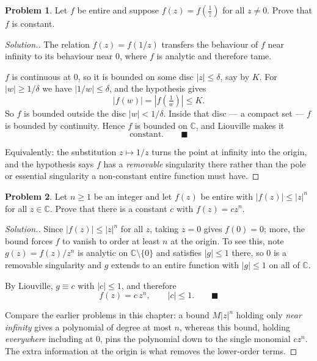 \documentclass[11pt,a4paper]{article}
\theoremstyle{definition}
\newtheorem{problemx}{Problem}[section]
\newenvironment{problem}{\begin{problemx}}{\end{problemx}}
\newenvironment{solution}
  {\renewcommand{\qedsymbol}{}\begin{proof}[\textit{Solution}.]}
  {\end{proof}}
\begin{document}
\begin{problem}
Let $f$ be entire and suppose $f(z) = f\!\left(\frac{1}{z}\right)$ for all
$z \neq 0$. Prove that $f$ is constant.
\end{problem}

\begin{solution}
The relation $f(z) = f(1/z)$ transfers the behaviour of $f$ near infinity to its
behaviour near $0$, where $f$ is analytic and therefore tame.

$f$ is continuous at $0$, so it is bounded on some disc $\left|z\right| \leq \delta$,
say by $K$. For $\left|w\right| \geq 1/\delta$ we have
$\left|1/w\right| \leq \delta$, and the hypothesis gives
$$\left|f(w)\right| = \left|f\!\left(\tfrac1w\right)\right| \leq K .$$
So $f$ is bounded outside the disc $\left|w\right| < 1/\delta$. Inside that
disc --- a compact set --- $f$ is bounded by continuity. Hence $f$ is bounded on
$\mathbb{C}$, and Liouville makes it
$$\boxed{\text{constant.}} \qquad \blacksquare$$

Equivalently: the substitution $z \mapsto 1/z$ turns the point at infinity into the
origin, and the hypothesis says $f$ has a \emph{removable} singularity there rather
than the pole or essential singularity a non-constant entire function must have.
\end{solution}


\begin{problem}
Let $n \geq 1$ be an integer and let $f(z)$ be entire with
$\left|f(z)\right| \leq \left|z\right|^{n}$ for all $z \in \mathbb{C}$. Prove
that there is a constant $c$ with $f(z) = cz^{n}$.
\end{problem}

\begin{solution}
Since $\left|f(z)\right| \leq \left|z\right|^{n}$ for all $z$, taking $z = 0$ gives
$f(0) = 0$; more, the bound forces $f$ to vanish to order at least $n$ at the
origin. To see this, note $g(z) = f(z)/z^{n}$ is analytic on
$\mathbb{C}\setminus\{0\}$ and satisfies $\left|g\right| \leq 1$ there, so $0$ is a
removable singularity and $g$ extends to an entire function with
$\left|g\right| \leq 1$ on all of $\mathbb{C}$.

By Liouville, $g \equiv c$ with $\left|c\right| \leq 1$, and therefore
$$\boxed{f(z) = c\,z^{n},\qquad \left|c\right| \leq 1 .} \qquad \blacksquare$$

Compare the earlier problems in this chapter: a bound $M\left|z\right|^{n}$
holding only \emph{near infinity} gives a polynomial of degree at most $n$, whereas
this bound, holding \emph{everywhere} including at $0$, pins the polynomial down to
the single monomial $cz^{n}$. The extra information at the origin is what removes
the lower-order terms.
\end{solution}
\end{document}
